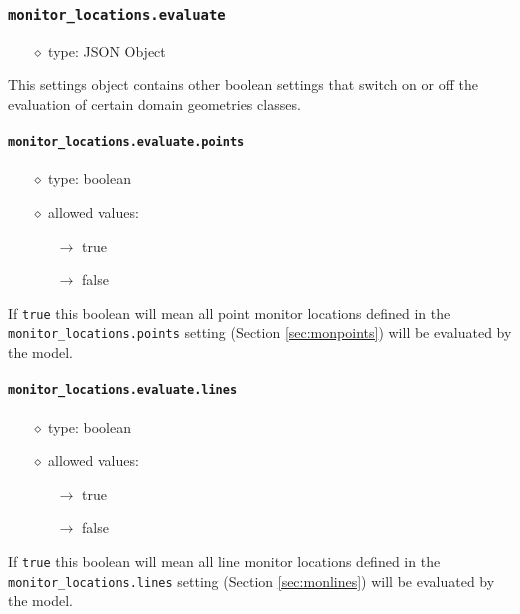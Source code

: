 \documentclass[]{article}
\def\code#1{\texttt{#1}}
\begin{document}
\subsubsection{\code{monitor\_locations.evaluate}}
\begin{itemize}
    \item[$\diamond$] type: JSON Object 
\end{itemize}
This settings object contains other boolean settings that switch on or off the
evaluation of certain domain geometries classes.

\paragraph{\code{monitor\_locations.evaluate.points}}
\begin{itemize}
    \item[$\diamond$] type: boolean
    \item[$\diamond$] allowed values:
    \begin{itemize}
        \item[$\rightarrow$] true
        \item[$\rightarrow$] false
    \end{itemize}
\end{itemize}
If \code{true} this boolean will mean all point monitor locations defined in the
\code{monitor\_locations.points} setting (Section \ref{sec:monpoints}) will be
evaluated by the model.

\paragraph{\code{monitor\_locations.evaluate.lines}}
\begin{itemize}
    \item[$\diamond$] type: boolean
    \item[$\diamond$] allowed values:
    \begin{itemize}
        \item[$\rightarrow$] true
        \item[$\rightarrow$] false
    \end{itemize}
\end{itemize}
If \code{true} this boolean will mean all line monitor locations defined in the
\code{monitor\_locations.lines} setting (Section \ref{sec:monlines}) will be
evaluated by the model.
\end{document}
